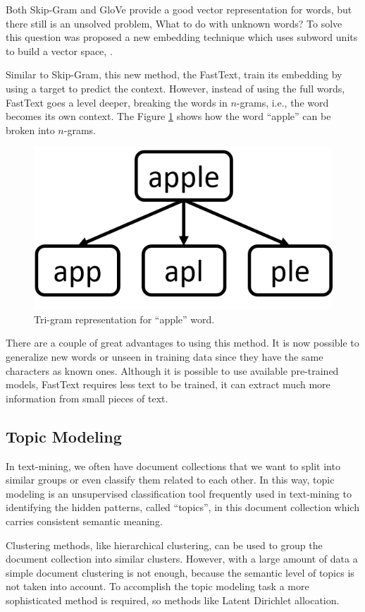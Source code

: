 	Both Skip-Gram and GloVe provide a good vector representation for words, but there still is an unsolved problem, What to do with unknown words? To solve this question was proposed a new embedding technique which uses subword units to build a vector space, \cite{bojanowski2017enriching}.
	
	Similar to Skip-Gram, this new method, the FastText, train its embedding by using a target to predict the context. However, instead of using the full words, FastText goes a level deeper, breaking the words in $n$-grams, i.e., the word becomes its own context. The Figure \ref{fig:apple-tri-gram} shows how the word ``apple'' can be broken into $n$-grams. 
		
	\begin{figure}[h!]
		\centering
		\includegraphics[width=0.4\linewidth]{01.Chapters/02.Background/apple-tri-gram}
		\caption{Tri-gram representation for ``apple'' word.}
		\label{fig:apple-tri-gram}
	\end{figure}
	
	There are a couple of great advantages to using this method. It is now possible to generalize new words or unseen in training data since they have the same characters as known ones. Although it is possible to use available pre-trained models, FastText requires less text to be trained, it can extract much more information from small pieces of text.	
	
	\subsection{Topic Modeling}
	
	In text-mining, we often have document collections that we want to split into similar groups or even classify them related to each other. In this way, topic modeling is an unsupervised classification tool frequently used in text-mining to identifying the hidden patterns, called ``topics'', in this document collection which carries consistent semantic meaning.
	
	Clustering methods, like hierarchical clustering, can be used to group the document collection into similar clusters. However, with a large amount of data a simple document clustering is not enough, because the semantic level of topics is not taken into account. To accomplish the topic modeling task a more sophisticated method is required, so methods like Latent Dirichlet allocation.
	
